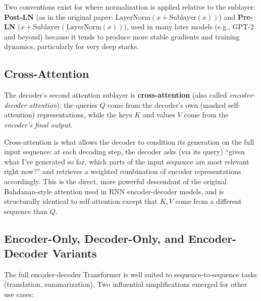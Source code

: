 \documentclass[11pt]{article}
\begin{document}
Two conventions exist for where normalization is applied relative to the sublayer: \textbf{Post-LN} (as in the original paper: $\text{LayerNorm}(x + \text{Sublayer}(x))$) and \textbf{Pre-LN} ($x + \text{Sublayer}(\text{LayerNorm}(x))$), used in many later models (e.g., GPT-2 and beyond) because it tends to produce more stable gradients and training dynamics, particularly for very deep stacks.

\subsection*{Cross-Attention}

The decoder's second attention sublayer is \textbf{cross-attention} (also called \emph{encoder-decoder attention}): the queries $Q$ come from the decoder's own (masked self-attention) representations, while the keys $K$ and values $V$ come from the \emph{encoder's final output}.

\begin{keyidea}
Cross-attention is what allows the decoder to condition its generation on the full input sequence: at each decoding step, the decoder asks (via its query) ``given what I've generated so far, which parts of the input sequence are most relevant right now?'' and retrieves a weighted combination of encoder representations accordingly. This is the direct, more powerful descendant of the original Bahdanau-style attention used in RNN encoder-decoder models, and is structurally identical to self-attention except that $K, V$ come from a different sequence than $Q$.
\end{keyidea}

\subsection*{Encoder-Only, Decoder-Only, and Encoder-Decoder Variants}

The full encoder-decoder Transformer is well suited to sequence-to-sequence tasks (translation, summarization). Two influential simplifications emerged for other use cases:
\end{document}
